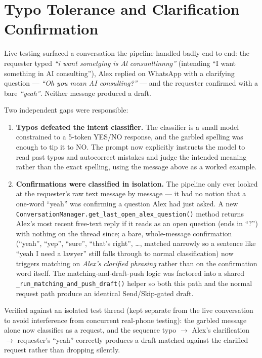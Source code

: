 \documentclass[12pt, a4paper]{report}
\begin{document}
\section{Typo Tolerance and Clarification Confirmation}

Live testing surfaced a conversation the pipeline handled badly end to end: the requester typed \emph{``i want sometging is Al consunltinnng''} (intending ``I want something in AI consulting''), Alex replied on WhatsApp with a clarifying question --- \emph{``Oh you mean AI consulting?''} --- and the requester confirmed with a bare \emph{``yeah''}. Neither message produced a draft.

Two independent gaps were responsible:

\begin{enumerate}[itemsep=3pt]
    \item \textbf{Typos defeated the intent classifier.} The classifier is a small model constrained to a 5-token YES/NO response, and the garbled spelling was enough to tip it to NO. The prompt now explicitly instructs the model to read past typos and autocorrect mistakes and judge the intended meaning rather than the exact spelling, using the message above as a worked example.
    \item \textbf{Confirmations were classified in isolation.} The pipeline only ever looked at the requester's raw text message by message --- it had no notion that a one-word ``yeah'' was confirming a question Alex had just asked. A new \texttt{ConversationManager.get\_last\_open\_alex\_question()} method returns Alex's most recent free-text reply if it reads as an open question (ends in ``?'') with nothing on the thread since; a bare, whole-message confirmation (``yeah'', ``yep'', ``sure'', ``that's right'', \ldots, matched narrowly so a sentence like ``yeah I need a lawyer'' still falls through to normal classification) now triggers matching on \emph{Alex's clarified phrasing} rather than on the confirmation word itself. The matching-and-draft-push logic was factored into a shared \texttt{\_run\_matching\_and\_push\_draft()} helper so both this path and the normal request path produce an identical Send/Skip-gated draft.
\end{enumerate}

Verified against an isolated test thread (kept separate from the live conversation to avoid interference from concurrent real-phone testing): the garbled message alone now classifies as a request, and the sequence typo $\to$ Alex's clarification $\to$ requester's ``yeah'' correctly produces a draft matched against the clarified request rather than dropping silently.
\end{document}
